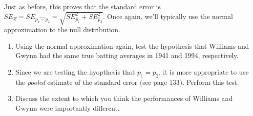 \documentclass[10pt]{article}\usepackage[]{graphicx}\usepackage[]{color}
\begin{document}
Just as before, this proves that the standard error is $SE_Z = SE_{\widehat{p_1 - p_2}} = \sqrt{SE_{\hat{p}_1}^2 + SE_{\hat{p}_2}^2}$. Once again, we'll typically use the normal approximation to the null distribution.  

\begin{enumerate}
  \itemsep1in
  \item Using the normal approximation again, test the hypothesis that Williams and Gwynn had the same true batting averages in 1941 and 1994, respectively. 
  
  \item Since we are testing the hyopthesis that $p_1 = p_2$, it is more appropriate to use the \emph{pooled} estimate of the standard error (see page 133). Perform this test.
  
  \item Discuss the extent to which you think the performances of Williams and Gwynn were importantly different. 
\end{enumerate}


\end{document}
